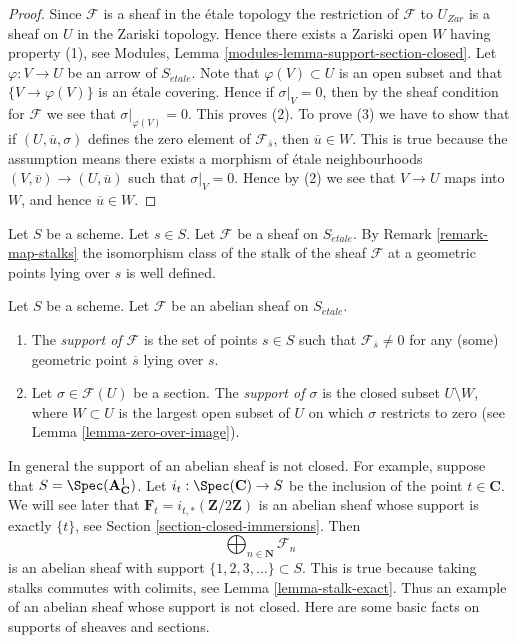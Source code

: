 \begin{proof}
Since $\mathcal{F}$ is a sheaf in the \'etale topology the restriction of
$\mathcal{F}$ to $U_{Zar}$ is a sheaf on $U$ in the Zariski topology.
Hence there exists a Zariski open $W$ having property (1), see
Modules, Lemma \ref{modules-lemma-support-section-closed}. Let
$\varphi : V \to U$ be an arrow of $S_{\acute{e}tale}$. Note that
$\varphi(V) \subset U$ is an open subset and that
$\{V \to \varphi(V)\}$ is an \'etale covering. Hence if
$\sigma|_V = 0$, then by the sheaf condition for $\mathcal{F}$ we
see that $\sigma|_{\varphi(V)} = 0$. This proves (2).
To prove (3) we have to show that if $(U, \overline{u}, \sigma)$
defines the zero element of $\mathcal{F}_{\overline{s}}$, then
$\overline{u} \in W$. This is true because the assumption means
there exists a morphism of \'etale neighbourhoods
$(V, \overline{v}) \to (U, \overline{u})$ such that
$\sigma|_V = 0$. Hence by (2) we see that $V \to U$ maps into $W$, and
hence $\overline{u} \in W$.
\end{proof}

\noindent
Let $S$ be a scheme. Let $s \in S$.
Let $\mathcal{F}$ be a sheaf on $S_{\acute{e}tale}$. By
Remark \ref{remark-map-stalks}
the isomorphism class of the stalk of the sheaf $\mathcal{F}$
at a geometric points lying over $s$ is well defined.

\begin{definition}
\label{definition-support}
Let $S$ be a scheme.
Let $\mathcal{F}$ be an abelian sheaf on $S_{\acute{e}tale}$.
\begin{enumerate}
\item The {\it support of $\mathcal{F}$} is the set of
points $s \in S$ such that $\mathcal{F}_{\overline{s}} \not = 0$
for any (some) geometric point $\overline{s}$ lying over $s$.
\item Let $\sigma \in \mathcal{F}(U)$ be a section.
The {\it support of $\sigma$} is the closed subset $U \setminus W$, where
$W \subset U$ is the largest open subset of $U$ on which $\sigma$
restricts to zero (see
Lemma \ref{lemma-zero-over-image}).
\end{enumerate}
\end{definition}

\noindent
In general the support of an abelian sheaf is not closed.
For example, suppose that $S = \Spec(\mathbf{A}^1_{\mathbf{C}})$.
Let $i_t : \Spec(\mathbf{C}) \to S$ be the inclusion of the
point $t \in \mathbf{C}$.
We will see later that $\mathbf{F}_t = i_{t, *}(\mathbf{Z}/2\mathbf{Z})$
is an abelian sheaf whose support is exactly $\{t\}$, see
Section \ref{section-closed-immersions}.
Then
$$
\bigoplus\nolimits_{n \in \mathbf{N}} \mathcal{F}_n
$$
is an abelian sheaf with support $\{1, 2, 3, \ldots\} \subset S$.
This is true because taking stalks commutes with colimits, see
Lemma \ref{lemma-stalk-exact}.
Thus an example of an abelian sheaf whose support is not closed.
Here are some basic facts on supports of sheaves and sections.

